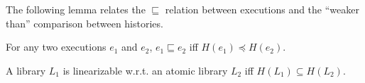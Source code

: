 
The following lemma relates the $\sqsubseteq$ relation between executions 
and the ``weaker than'' comparison between histories. 

\begin{lemma}
  \label{lemma:exec_hist}

     For any two executions $e_1$ and $e_2$, $e_1\sqsubseteq e_2$ iff $H(e_1)\preceq H(e_2)$.

\end{lemma}





\begin{proposition}

A library $L_1$ is linearizable w.r.t. an atomic library $L_2$ iff $H(L_1)\subseteq H(L_2)$.

\end{proposition}

